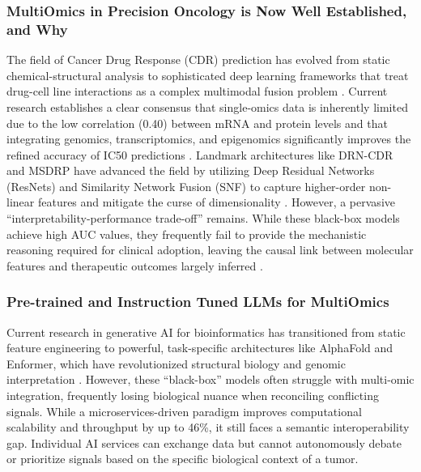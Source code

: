 \documentclass{article}
\begin{document}
\subsubsection{MultiOmics in Precision Oncology is Now Well Established, and Why}%
The field of Cancer Drug Response (CDR) prediction has evolved from static chemical-structural analysis to sophisticated deep learning frameworks that treat drug-cell line interactions as a complex multimodal fusion problem \cite{saranya2024drn, zhao2023msdrp, chen2024innovative}. Current research establishes a clear consensus that single-omics data is inherently limited due to the low correlation (0.40) between mRNA and protein levels and that integrating genomics, transcriptomics, and epigenomics significantly improves the refined accuracy of IC50 predictions \cite{du2024advances, saranya2024drn, chen2024innovative, liu2023prediction}. Landmark architectures like DRN-CDR and MSDRP have advanced the field by utilizing Deep Residual Networks (ResNets) and Similarity Network Fusion (SNF) to capture higher-order non-linear features and mitigate the curse of dimensionality \cite{saranya2024drn, zhao2023msdrp, almutiri2023predicting, liu2023prediction}. However, a pervasive ``interpretability-performance trade-off'' remains. While these black-box models achieve high AUC values, they frequently fail to provide the mechanistic reasoning required for clinical adoption, leaving the causal link between molecular features and therapeutic outcomes largely inferred \cite{zhao2023msdrp, chen2024innovative, jiang2025network, almutiri2023predicting}.   

\subsubsection{Pre-trained and Instruction Tuned LLMs for MultiOmics}
Current research in generative AI for bioinformatics has transitioned from static feature engineering to powerful, task-specific architectures like AlphaFold and Enformer, which have revolutionized structural biology and genomic interpretation \cite{hein2025ai}. However, these ``black-box'' models often struggle with multi-omic integration, frequently losing biological nuance when reconciling conflicting signals. While a microservices-driven paradigm \cite{elsayed2026generative} improves computational scalability and throughput by up to 46\%, it still faces a semantic interoperability gap. Individual AI services can exchange data but cannot autonomously debate or prioritize signals based on the specific biological context of a tumor. 
 
\end{document}
